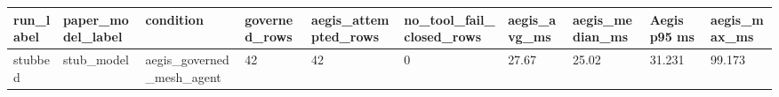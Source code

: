 \begin{tabular}{llllllllll}
 \hline
run\_label & paper\_model\_label & condition & governed\_rows & aegis\_attempted\_rows & no\_tool\_fail\_closed\_rows & aegis\_avg\_ms & aegis\_median\_ms & Aegis p95 ms & aegis\_max\_ms \\
 \hline
stubbed & stub\_model & aegis\_governed\_mesh\_agent & 42 & 42 & 0 & 27.67 & 25.02 & 31.231 & 99.173 \\
 \hline
\end{tabular}
